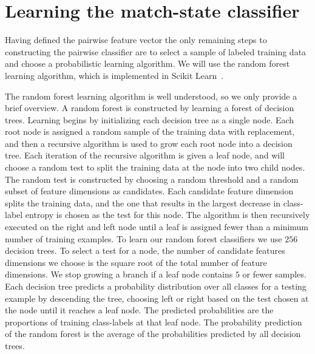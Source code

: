 

\section{Learning the match-state classifier}\label{sec:learnclf}

    Having defined the pairwise feature vector the only remaining steps to constructing the pairwise classifier
      are to select a sample of labeled training data and choose a probabilistic learning algorithm.
    We will use the random forest learning algorithm, which is implemented in Scikit
      Learn~\cite{pedregosa_scikit_learn_2011}.

    The random forest learning algorithm is well understood, so we only provide a brief overview.
    A random forest is constructed by learning a forest of decision trees.
    Learning begins by initializing each decision tree as a single node.
    Each root node is assigned a random sample of the training data with replacement, and then a recursive
      algorithm is used to grow each root node into a decision tree.
    Each iteration of the recursive algorithm is given a leaf node, and will choose a random test to split the
      training data at the node into two child nodes.
    The random test is constructed by choosing a random threshold and a random subset of feature dimensions as
      candidates.
    Each candidate feature dimension splits the training data, and the one that results in the largest decrease
      in class-label entropy is chosen as the test for this node.
    The algorithm is then recursively executed on the right and left node until a leaf is assigned fewer than a
      minimum number of training examples.
    To learn our random forest classifiers we use $256$ decision trees.
    To select a test for a node, the number of candidate features dimensions we choose is the square root of the
      total number of feature dimensions.
    We stop growing a branch if a leaf node contains $5$ or fewer samples.
    Each decision tree predicts a probability distribution over all classes for a testing example by descending
      the tree, choosing left or right based on the test chosen at the node until it reaches a leaf node.
    The predicted probabilities are the proportions of training class-labels at that leaf node.
    The probability prediction of the random forest is the average of the probabilities predicted by all decision
      trees.

